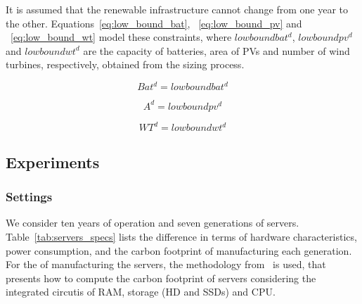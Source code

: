 It is assumed that the renewable infrastructure cannot change from one year to the other. Equations~\eqref{eq:low_bound_bat},  ~\eqref{eq:low_bound_pv} and ~\eqref{eq:low_bound_wt} model these constraints, where $lowboundbat^d$, $lowboundpv^d$ and $lowboundwt^d$ are the capacity of batteries, area of PVs and number of wind turbines, respectively, obtained from the sizing process.

\begin{equation} \label{eq:low_bound_bat}
Bat^d = lowboundbat^d
\end{equation}

\begin{equation} \label{eq:low_bound_pv}
A^d = lowboundpv^d
\end{equation}

\begin{equation} \label{eq:low_bound_wt}
WT^d = lowboundwt^d
\end{equation}


\subsection{Experiments}

\subsubsection{Settings}


We consider ten years of operation and seven generations of servers. Table~\ref{tab:servers_specs} lists the difference in terms of hardware characteristics, power consumption, and the carbon footprint of manufacturing each generation. For the  of manufacturing the servers, the methodology from~\cite{gupta2022_ACT} is used, that presents how to compute the carbon footprint of servers considering the integrated circutis of  RAM, storage (HD and SSDs) and CPU.


